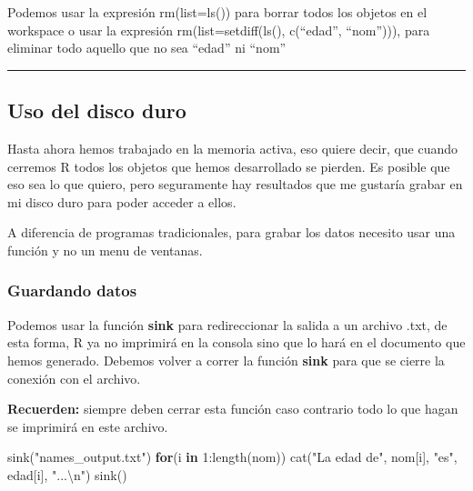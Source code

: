\documentclass[
]{article}
\newenvironment{Shaded}{\begin{snugshade}}{\end{snugshade}}
\newcommand{\ControlFlowTok}[1]{\textcolor[rgb]{0.13,0.29,0.53}{\textbf{#1}}}
\newcommand{\DecValTok}[1]{\textcolor[rgb]{0.00,0.00,0.81}{#1}}
\newcommand{\FunctionTok}[1]{\textcolor[rgb]{0.00,0.00,0.00}{#1}}
\newcommand{\NormalTok}[1]{#1}
\newcommand{\SpecialCharTok}[1]{\textcolor[rgb]{0.00,0.00,0.00}{#1}}
\newcommand{\StringTok}[1]{\textcolor[rgb]{0.31,0.60,0.02}{#1}}
\begin{document}
Podemos usar la expresión rm(list=ls()) para borrar todos los objetos en
el workspace o usar la expresión rm(list=setdiff(ls(), c(``edad'',
``nom''))), para eliminar todo aquello que no sea ``edad'' ni ``nom''

\begin{center}\rule{0.5\linewidth}{0.5pt}\end{center}

\hypertarget{uso-del-disco-duro}{%
\subsection{Uso del disco duro}\label{uso-del-disco-duro}}

Hasta ahora hemos trabajado en la memoria activa, eso quiere decir, que
cuando cerremos R todos los objetos que hemos desarrollado se pierden.
Es posible que eso sea lo que quiero, pero seguramente hay resultados
que me gustaría grabar en mi disco duro para poder acceder a ellos.

A diferencia de programas tradicionales, para grabar los datos necesito
usar una función y no un menu de ventanas.

\hypertarget{guardando-datos}{%
\subsubsection{Guardando datos}\label{guardando-datos}}

Podemos usar la función \textbf{sink} para redireccionar la salida a un
archivo .txt, de esta forma, R ya no imprimirá en la consola sino que lo
hará en el documento que hemos generado. Debemos volver a correr la
función \textbf{sink} para que se cierre la conexión con el archivo.

\textbf{Recuerden:} siempre deben cerrar esta función caso contrario
todo lo que hagan se imprimirá en este archivo.

\begin{Shaded}
\begin{Highlighting}[]
\FunctionTok{sink}\NormalTok{(}\StringTok{"names\_output.txt"}\NormalTok{)}
\ControlFlowTok{for}\NormalTok{(i }\ControlFlowTok{in} \DecValTok{1}\SpecialCharTok{:}\FunctionTok{length}\NormalTok{(nom)) }\FunctionTok{cat}\NormalTok{(}\StringTok{"La edad de"}\NormalTok{, nom[i], }\StringTok{"es"}\NormalTok{, edad[i], }\StringTok{"...}\SpecialCharTok{\textbackslash{}n}\StringTok{"}\NormalTok{)}
\FunctionTok{sink}\NormalTok{()}
\end{Highlighting}
\end{Shaded}
\end{document}
